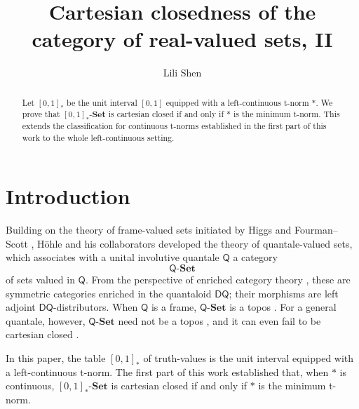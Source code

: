 \documentclass{birkau}
\theoremstyle{plain}
\theoremstyle{definition}
\newcommand{\sD}{\mathsf{D}}
\newcommand{\sQ}{\mathsf{Q}}
\newcommand{\Set}{\mathbf{Set}}
\newcommand{\QSet}{\sQ\text{-}\Set}
\newcommand{\RSet}{[0,1]_*\text{-}\Set}
\numberwithin{equation}{section}
\begin{document}
\title{Cartesian closedness of the category of real-valued sets, II}

\author[L. Shen]{Lili Shen}
\address{School of Mathematics, Sichuan University, Chengdu 610064, China}

\address{School of Mathematics, Sichuan University, Chengdu 610064, China}



\begin{abstract}
Let $[0,1]_*$ be the unit interval $[0,1]$ equipped with a left-continuous t-norm $*$. We prove that $[0,1]_*\text{-}\mathbf{Set}$ is cartesian closed if and only if $*$ is the minimum t-norm. This extends the classification for continuous t-norms established in the first part of this work to the whole left-continuous setting.
\end{abstract}

\maketitle

\section{Introduction}

Building on the theory of frame-valued sets initiated by Higgs \cite{Higgs1970,Higgs1984} and Fourman--Scott \cite{Fourman1979}, H\"ohle and his collaborators \cite{Hoehle1992,Hoehle1995a,Hoehle1995b,Hoehle2011a,Pu2012} developed the theory of quantale-valued sets, which associates with a unital involutive quantale $\sQ$ a category 
\[
\QSet
\]
of sets valued in $\sQ$. From the perspective of enriched category theory \cite{Stubbe2014}, these are symmetric categories enriched in the quantaloid $\sD\sQ$; their morphisms are left adjoint $\sD\sQ$-distributors. When $\sQ$ is a frame, $\QSet$ is a topos \cite{Fourman1979}. For a general quantale, however, $\QSet$ need not be a topos \cite{Hu2025}, and it can even fail to be cartesian closed \cite{Shen2026}.

In this paper, the table $[0,1]_*$ of truth-values is the unit interval equipped with a left-continuous t-norm. The first part of this work \cite{Shen2026} established that, when $*$ is continuous, $\RSet$ is cartesian closed if and only if $*$ is the minimum t-norm.
\end{document}
